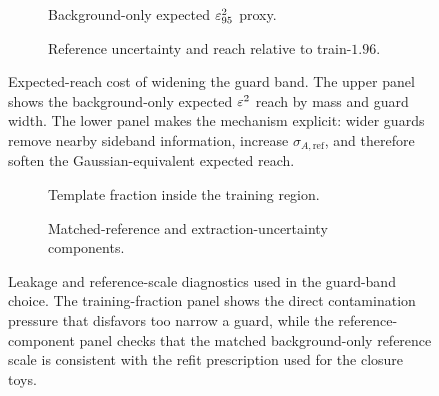 \begin{figure}[H]
\centering
\begin{subfigure}[t]{0.82\linewidth}
  \centering
  \caption{Background-only expected $\varepsilon^2_{95}$ proxy.}
\end{subfigure}

\vspace{0.8em}

\begin{subfigure}[t]{0.82\linewidth}
  \centering
  \caption{Reference uncertainty and reach relative to train-$1.96$.}
\end{subfigure}
\caption{Expected-reach cost of widening the guard band. The upper panel shows the
background-only expected $\varepsilon^2$ reach by mass and guard width. The lower panel makes
the mechanism explicit: wider guards remove nearby sideband information, increase
$\sigma_{A,\mathrm{ref}}$, and therefore soften the Gaussian-equivalent expected
reach.}
\label{fig:guard-band-reach-uncertainty}
\end{figure}

\begin{figure}[H]
\centering
\begin{subfigure}[t]{0.78\linewidth}
  \centering
  \caption{Template fraction inside the training region.}
\end{subfigure}

\vspace{0.8em}

\begin{subfigure}[t]{0.78\linewidth}
  \centering
  \caption{Matched-reference and extraction-uncertainty components.}
\end{subfigure}
\caption{Leakage and reference-scale diagnostics used in the guard-band choice. The training-fraction panel shows the direct contamination pressure that disfavors too narrow a guard, while the reference-component panel checks that the matched background-only reference scale is consistent with the refit prescription used for the closure toys.}
\label{fig:guard-band-leakage-reference}
\end{figure}

